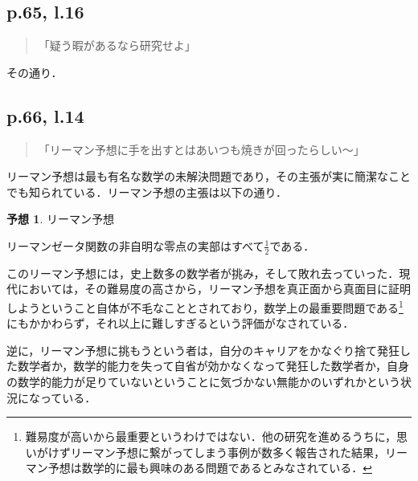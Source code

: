 \documentclass[10pt, a5paper, twoside]{jsarticle}
\theoremstyle{definition}
\newtheorem{hyp}{予想}
\begin{document}
            \subsection{p.65, l.16}

                \begin{quote}

                    「疑う暇があるなら研究せよ」

                \end{quote}

                その通り．

            \subsection{p.66, l.14}

                \begin{quote}

                    「リーマン予想に手を出すとはあいつも焼きが回ったらしい〜」

                \end{quote}

                リーマン予想は最も有名な数学の未解決問題であり，その主張が実に簡潔なことでも知られている．リーマン予想の主張は以下の通り\cite{sei}．

            \newpage

                \begin{hyp}

                    リーマン予想

                    リーマンゼータ関数の非自明な零点の実部はすべて$\displaystyle \frac{1}{2}$である．

                \end{hyp}

                このリーマン予想には，史上数多の数学者が挑み，そして敗れ去っていった．現代においては，その難易度の高さから，リーマン予想を真正面から真面目に証明しようということ自体が不毛なこととされており，数学上の最重要問題である\footnote{難易度が高いから最重要というわけではない．他の研究を進めるうちに，思いがけずリーマン予想に繋がってしまう事例が数多く報告された結果，リーマン予想は数学的に最も興味のある問題であるとみなされている．}にもかかわらず，それ以上に難しすぎるという評価がなされている．

                逆に，リーマン予想に挑もうという者は，自分のキャリアをかなぐり捨て発狂した数学者か，数学的能力を失って自省が効かなくなって発狂した数学者か，自身の数学的能力が足りていないということに気づかない無能かのいずれかという状況になっている．
\end{document}
